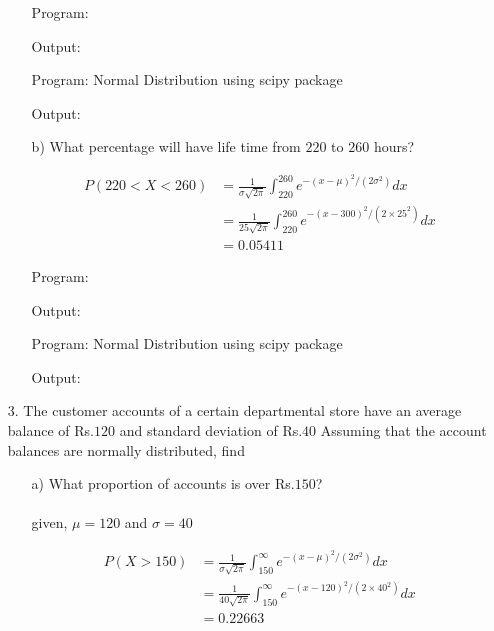 \documentclass[a4paper,10pt,openright]{report}
\begin{document}
\begin{enumerate}
\begin{enumerate}
Program:

Output:


Program: Normal Distribution using scipy package

Output:


\item[b)] What percentage will have life time from $220$ to $260$ hours?

\begin{equation*}
\begin{split}
P(220 < X < 260) &= \frac{1}{\sigma\sqrt{2\pi}} \int_{220}^{260} e^{-(x-\mu)^2/(2\sigma^{2})} dx \\
		&= \frac{1}{25\sqrt{2\pi}} \int_{220}^{260} e^{-(x-300)^2/(2 \times 25^{2})} dx \\
		&= 0.05411
\end{split}
\end{equation*}

Program:

Output:


Program: Normal Distribution using scipy package

Output:


\end{enumerate}

\item[3.] The customer accounts of a certain departmental store have an average balance of
Rs.$120$ and standard deviation of Rs.$40$ Assuming that the account balances are normally
distributed, find

\begin{enumerate}

\item[a)] What proportion of accounts is over Rs.$150$? \\ \\
given, $\mu = 120$ and $\sigma = 40$

\begin{equation*}
\begin{split}
P(X > 150) &= \frac{1}{\sigma\sqrt{2\pi}} \int_{150}^{\infty} e^{-(x-\mu)^2/(2\sigma^{2})} dx \\
		   &= \frac{1}{40\sqrt{2\pi}} \int_{150}^{\infty} e^{-(x-120)^2/(2 \times 40^{2})} dx \\
		   &= 0.22663
\end{split}
\end{equation*}


\end{enumerate}
\end{enumerate}
\end{document}
